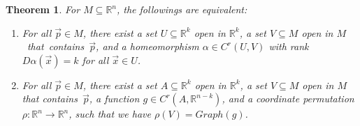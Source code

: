 \documentclass[15pt]{book}
\theoremstyle{break}
\theoremstyle{break}
\newtheorem{thm}{Theorem}[section]
\newcommand{\R}{\mathbb{R}}
\begin{document}
\begin{thm}
For $M \subseteq  \R^n$, the followings are equivalent:
\begin{enumerate}[topsep=3pt,itemsep=-1ex,partopsep=1ex,parsep=1ex]
\item For all $\vec{p}\in M$, there exist a set $U\subseteq \R^k$ open in $\R^k$, a set $V \subseteq M$ open in \mbox{$M$ that contains $\vec{p}$,} and a homeomorphism $\alpha \in C^r(U,V)$ with rank $D\alpha(\vec{x}) = k$ for all $\vec{x}\in U$.  
\item For all $\vec{p}\in M$, there exist a set $A \subseteq \R^k$ open in $\R^k$, a set $V\subseteq M$ open in $M$ that \mbox{contains $\vec{p}$,} a function $g\in C^r(A,\R^{n-k})$, and a coordinate permutation $\rho:\R^n \to \R^n$, such that we have $\rho(V) = Graph(g)$.  
\end{enumerate}
\end{thm}
\end{document}
